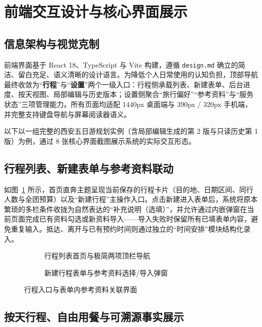 \section{前端交互设计与核心界面展示}

\subsection{信息架构与视觉克制}

前端界面基于 React 18、TypeScript 与 Vite 构建，遵循 \texttt{design.md} 确立的简洁、留白充足、语义清晰的设计语言。为降低个人日常使用的认知负担，顶部导航最终收敛为“\textbf{行程}”与“\textbf{设置}”两个一级入口：行程侧承载列表、新建表单、后台进度、按天视图、局部编辑与历史版本；设置侧聚合“旅行偏好”“参考资料”与“服务状态”三项管理能力。所有页面均适配 1440px 桌面端与 390px / 320px 手机端，并完整支持键盘导航与屏幕阅读器语义。

以下以一组完整的西安五日游规划实例（含局部编辑生成的第 2 版与只读历史第 1 版）为例，通过 8 张核心界面截图展示系统的实际交互形态。

\subsection{行程列表、新建表单与参考资料联动}

如图~\ref{fig:ui-home-form} 所示，首页直奔主题呈现当前保存的行程卡片（目的地、日期区间、同行人数与全团预算）以及“新建行程”主操作入口。点击新建进入表单后，系统将原本繁琐的多栏条件收拢为自然表达的“补充说明（选填）”，并允许通过内嵌弹窗在当前页面完成已有资料勾选或新资料导入——导入失败时保留所有已填表单内容，避免重复输入。抵达、离开与已有预约时间则通过独立的“时间安排”模块结构化录入。

\begin{figure}[H]
  \centering
  \begin{subfigure}[t]{0.48\textwidth}
    \centering
    \caption{行程列表首页与极简两项顶栏导航}
  \end{subfigure}\hfill
  \begin{subfigure}[t]{0.48\textwidth}
    \centering
    \caption{新建行程表单与参考资料选择/导入弹窗}
  \end{subfigure}
  \caption{行程入口与表单内参考资料关联界面}
  \label{fig:ui-home-form}
\end{figure}

\subsection{按天行程、自由用餐与可溯源事实展示}

